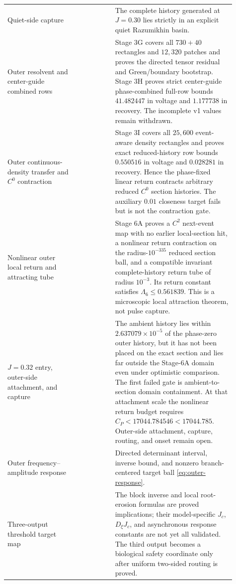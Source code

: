 \begin{longtable}{@{}L{0.28\linewidth}L{0.15\linewidth}L{0.48\linewidth}@{}}
Quiet-side capture
& 
& The complete history generated at \(J=0.30\) lies strictly in an explicit
  quiet Razumikhin basin.\\

Outer resolvent and center-guide combined rows
& 
& Stage 3G covers all \(730+40\) rectangles and \(12{,}320\) patches and
  proves the directed tensor residual and Green/boundary bootstrap.  Stage
  3H proves strict center-guide phase-combined full-row bounds
  \(41.482447\) in voltage and \(1.177738\) in recovery.  The incomplete v1
  values remain withdrawn.\\

Outer continuous-density transfer and \(C^0\) contraction
& 
& Stage 3I covers all \(25{,}600\) event-aware density rectangles and proves
  exact reduced-history row bounds \(0.550516\) in voltage and \(0.028281\)
  in recovery.  Hence the phase-fixed linear return contracts arbitrary
  reduced \(C^0\) section histories.  The auxiliary \(0.01\) closeness
  target fails but is not the contraction gate.\\

Nonlinear outer local return and attracting tube
& 
& Stage 6A proves a \(C^2\) next-event map with no earlier local-section hit,
  a nonlinear return contraction on the radius-\(10^{-335}\) reduced section
  ball, and a compatible invariant complete-history return tube of radius
  \(10^{-3}\).  Its return constant satisfies
  \(\Lambda_6\le0.561839\).  This is a
  microscopic local attraction theorem, not pulse capture.\\

\(J=0.32\) entry, outer-side attachment, and capture
& 
& The ambient history lies within \(2.637079\times10^{-5}\) of the phase-zero
  outer history, but it has not been placed on the exact section and lies far
  outside the Stage-6A domain even under optimistic comparison.  The first
  failed gate is ambient-to-section domain containment.  At that attachment
  scale the nonlinear return budget requires
  \(C_P<17044.784546<17044.785\).  Outer-side attachment, capture, routing,
  and onset remain open.\\

Outer frequency--amplitude response
& 
& Directed determinant interval, inverse bound, and nonzero branch-centered
  target ball \cref{eq:outer-response}.\\

Three-output threshold target map
& 
& The block inverse and local root-erosion formulas are proved implications;
  their model-specific \(J_c\), \(D_\xi J_c\), and asynchronous response
  constants are not yet all validated.  The third output becomes a
  biological safety coordinate only after uniform two-sided routing is
  proved.\\
\end{longtable}
\normalsize

